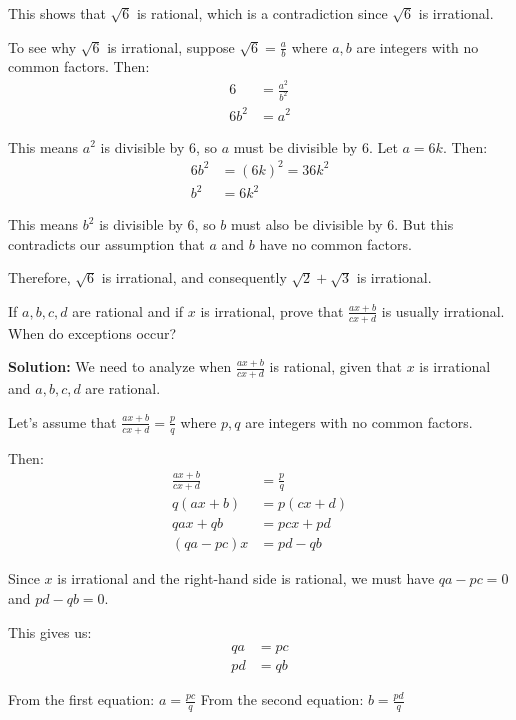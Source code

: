 This shows that $\sqrt{6}$ is rational, which is a contradiction since $\sqrt{6}$ is irrational.

To see why $\sqrt{6}$ is irrational, suppose $\sqrt{6} = \frac{a}{b}$ where $a, b$ are integers with no common factors. Then:
\begin{align*}
6 &= \frac{a^2}{b^2} \\
6b^2 &= a^2
\end{align*}

This means $a^2$ is divisible by 6, so $a$ must be divisible by 6. Let $a = 6k$. Then:
\begin{align*}
6b^2 &= (6k)^2 = 36k^2 \\
b^2 &= 6k^2
\end{align*}

This means $b^2$ is divisible by 6, so $b$ must also be divisible by 6. But this contradicts our assumption that $a$ and $b$ have no common factors.

Therefore, $\sqrt{6}$ is irrational, and consequently $\sqrt{2} + \sqrt{3}$ is irrational.

\begin{problembox}
If $a, b, c, d$ are rational and if $x$ is irrational, prove that $\frac{ax + b}{cx + d}$ is usually irrational. When do exceptions occur?
\end{problembox}

\textbf{Solution:}
We need to analyze when $\frac{ax + b}{cx + d}$ is rational, given that $x$ is irrational and $a, b, c, d$ are rational.

Let's assume that $\frac{ax + b}{cx + d} = \frac{p}{q}$ where $p, q$ are integers with no common factors.

Then:
\begin{align*}
\frac{ax + b}{cx + d} &= \frac{p}{q} \\
q(ax + b) &= p(cx + d) \\
qax + qb &= pcx + pd \\
(qa - pc)x &= pd - qb
\end{align*}

Since $x$ is irrational and the right-hand side is rational, we must have $qa - pc = 0$ and $pd - qb = 0$.

This gives us:
\begin{align*}
qa &= pc \\
pd &= qb
\end{align*}

From the first equation: $a = \frac{pc}{q}$
From the second equation: $b = \frac{pd}{q}$

